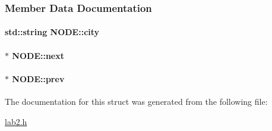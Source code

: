 \subsubsection{Member Data Documentation}
\hypertarget{structNODE_a76c9a9603778b363e65bfe84da4bd72e}{
\paragraph[{city}]{\setlength{\rightskip}{0pt plus 5cm}std\+::string N\+O\+D\+E\+::city}}\label{structNODE_a76c9a9603778b363e65bfe84da4bd72e}
\hypertarget{structNODE_a078472e8ab2d2fe38e052f5c2a425618}{
\paragraph[{next}]{$\ast$ N\+O\+D\+E\+::next}}\label{structNODE_a078472e8ab2d2fe38e052f5c2a425618}
\hypertarget{structNODE_ab92c64b5b2039998bbf32e9ed3bd55ef}{
\paragraph[{prev}]{$\ast$ N\+O\+D\+E\+::prev}}\label{structNODE_ab92c64b5b2039998bbf32e9ed3bd55ef}


The documentation for this struct was generated from the following file\+:\begin{DoxyCompactItemize}
\item 
\hyperlink{lab2_8h}{lab2.\+h}\end{DoxyCompactItemize}
